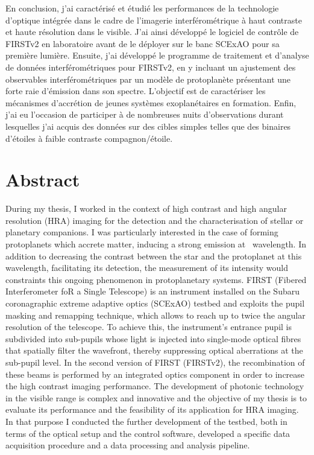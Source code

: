En conclusion, j'ai caractérisé et étudié les performances de la technologie d'optique intégrée dans le cadre de l'imagerie interférométrique à haut contraste et haute résolution dans le visible. J'ai ainsi développé le logiciel de contrôle de FIRSTv2 en laboratoire avant de le déployer sur le banc SCExAO pour sa première lumière. Ensuite, j'ai développé le programme de traitement et d'analyse de données interférométriques pour FIRSTv2, en y incluant un ajustement des observables interférométriques par un modèle de protoplanète présentant une forte raie d'émission dans son spectre. L'objectif est de caractériser les mécanismes d'accrétion de jeunes systèmes exoplanétaires en formation. Enfin, j'ai eu l'occasion de participer à de nombreuses nuits d'observations durant lesquelles j'ai acquis des données sur des cibles simples telles que des binaires d'étoiles à faible contraste compagnon/étoile.



\newpage
\thispagestyle{empty}
\chapter*{Abstract}

During my thesis, I worked in the context of high contrast and high angular resolution (HRA) imaging for the detection and the characterisation of stellar or planetary companions. I was particularly interested in the case of forming protoplanets which accrete matter, inducing a strong emission at \ha~wavelength. In addition to decreasing the contrast between the star and the protoplanet at this wavelength, facilitating its detection, the measurement of its intensity would constraints this ongoing phenomenon in protoplanetary systems. FIRST (Fibered Interferometer foR a Single Telescope) is an instrument installed on the Subaru coronagraphic extreme adaptive optics (SCExAO) testbed and exploits the pupil masking and remapping technique, which allows to reach up to twice the angular resolution of the telescope. To achieve this, the instrument's entrance pupil is subdivided into sub-pupils whose light is injected into single-mode optical fibres that spatially filter the wavefront, thereby suppressing optical aberrations at the sub-pupil level. In the second version of FIRST (FIRSTv2), the recombination of these beams is performed by an integrated optics component in order to increase the high contrast imaging performance. The development of photonic technology in the visible range is complex and innovative and the objective of my thesis is to evaluate its performance and the feasibility of its application for HRA imaging. In that purpose I conducted the further development of the testbed, both in terms of the optical setup and the control software, developed a specific data acquisition procedure and a data processing and analysis pipeline.

